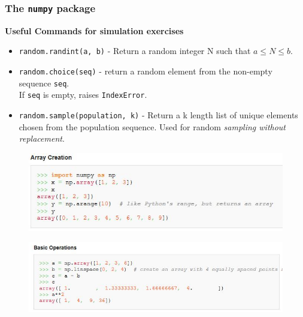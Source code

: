 \documentclass[MASTER.tex]{subfiles}
\begin{document}
\begin{frame}
\frametitle{The \texttt{numpy} package}
\Large	
\textbf{Useful Commands for simulation exercises}
\begin{itemize}
\item \texttt{random.randint(a, b)} - Return a random integer N such that $a \leq N \leq b$.

\item \texttt{random.choice(seq)} - return a random element from the non-empty sequence \texttt{seq}. \\ If \texttt{seq} is empty, raises \texttt{IndexError}.

\item \texttt{random.sample(population, k)} - 
Return a k length list of unique elements chosen from the population sequence. Used for random \textit{sampling without replacement}.
\end{itemize}
\end{frame}
\begin{frame}
	\begin{figure}
\centering
\includegraphics[width=1.16\linewidth]{numpyarraycreation}

\end{figure}

\end{frame}	
\begin{frame}
	\begin{figure}
		\centering
		\includegraphics[width=1.15\linewidth]{numpybasicoperations}

	\end{figure}
	
\end{frame}	
\end{document}
